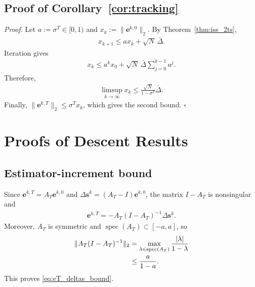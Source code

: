 \documentclass[letterpaper, 10 pt, conference]{ieeeconf} %
\newenvironment{proof}[1][Proof]{\par\noindent\textit{#1. }\ignorespaces}
  {\hfill$\square$\par}
\begin{document}
\subsection{Proof of Corollary~\ref{cor:tracking}}
\begin{proof}
Let \(a:=\sigma^T\in[0,1)\) and \(x_k:=\|\mathbf e^{k,0}\|_2\). By Theorem~\ref{thm:iss_2ts},
\begin{align}
x_{k+1}
\le
a x_k+\sqrt N\,\bar\Delta.
\end{align}
Iteration gives
\begin{align}
x_k
\le
a^k x_0
+
\sqrt N\,\bar\Delta
\sum_{j=0}^{k-1}a^j.
\end{align}
Therefore,
\begin{align}
\limsup_{k\to\infty}x_k
\le
\frac{\sqrt N}{1-\sigma^T}\bar\Delta.
\end{align}
Finally, \(\|\mathbf e^{k,T}\|_2\le\sigma^T x_k\), which gives the second bound.
\end{proof}

\section{Proofs of Descent Results}
\label{app:descent_proofs}

\subsection{Estimator-increment bound}
Since \(\mathbf e^{k,T}=A_T\mathbf e^{k,0}\) and \(\Delta\mathbf s^k=(A_T-I)\mathbf e^{k,0}\), the matrix \(I-A_T\) is nonsingular and
\begin{align}
\mathbf e^{k,T}
=
-A_T(I-A_T)^{-1}\Delta\mathbf s^k .
\end{align}
Moreover, \(A_T\) is symmetric and \(\operatorname{spec}(A_T)\subset[-a,a]\), so
\begin{align}
\|A_T(I-A_T)^{-1}\|_2
&=
\max_{\lambda\in\operatorname{spec}(A_T)}
\frac{|\lambda|}{1-\lambda}
\notag\\
&\le
\frac{a}{1-a}.
\end{align}
This proves \eqref{eq:eT_deltas_bound}.
\end{document}
